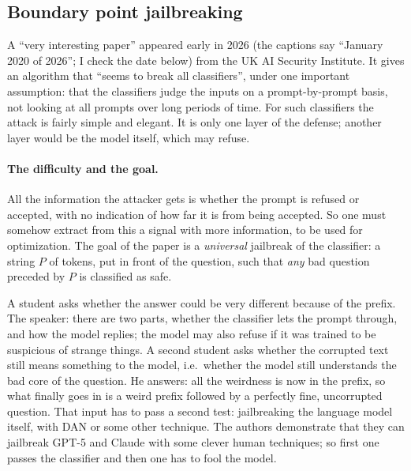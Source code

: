 \subsection{Boundary point jailbreaking}\label{sec:L8-bpj}
A ``very interesting paper'' appeared early in 2026 (the captions say ``January 2020 of 2026''; I check the date below) from the UK AI Security Institute. It gives an algorithm that ``seems to break all classifiers'', under one important assumption: that the classifiers judge the inputs on a prompt-by-prompt basis, not looking at all prompts over long periods of time. For such classifiers the attack is fairly simple and elegant. It is only one layer of the defense; another layer would be the model itself, which may refuse.

\paragraph{The difficulty and the goal.}
All the information the attacker gets is whether the prompt is refused or accepted, with no indication of how far it is from being accepted. So one must somehow extract from this a signal with more information, to be used for optimization. The goal of the paper is a \emph{universal} jailbreak of the classifier: a string $P$ of tokens, put in front of the question, such that \emph{any} bad question preceded by $P$ is classified as safe.

\begin{discussion}
A student asks whether the answer could be very different because of the prefix. The speaker: there are two parts, whether the classifier lets the prompt through, and how the model replies; the model may also refuse if it was trained to be suspicious of strange things. A second student asks whether the corrupted text still means something to the model, i.e.\ whether the model still understands the bad core of the question. He answers: all the weirdness is now in the prefix, so what finally goes in is a weird prefix followed by a perfectly fine, uncorrupted question. That input has to pass a second test: jailbreaking the language model itself, with DAN or some other technique. The authors demonstrate that they can jailbreak GPT-5 and Claude with some clever human techniques; so first one passes the classifier and then one has to fool the model.
\end{discussion}

